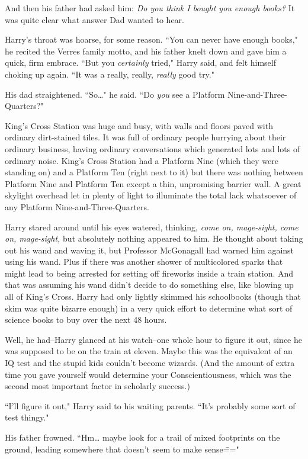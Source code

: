 And then his father had asked him: \emph{Do you think I bought you enough books?} It was quite clear what answer Dad wanted to hear.

Harry's throat was hoarse, for some reason. ``You can never have enough books," he recited the Verres family motto, and his father knelt down and gave him a quick, firm embrace. ``But you \emph{certainly} tried," Harry said, and felt himself choking up again. ``It was a really, really, \emph{really} good try."

His dad straightened. ``So{\ldots}" he said. ``Do \emph{you} see a Platform Nine-and-Three-Quarters?"

King's Cross Station was huge and busy, with walls and floors paved with ordinary dirt-stained tiles. It was full of ordinary people hurrying about their ordinary business, having ordinary conversations which generated lots and lots of ordinary noise. King's Cross Station had a Platform Nine (which they were standing on) and a Platform Ten (right next to it) but there was nothing between Platform Nine and Platform Ten except a thin, unpromising barrier wall. A great skylight overhead let in plenty of light to illuminate the total lack whatsoever of any Platform Nine-and-Three-Quarters.

Harry stared around until his eyes watered, thinking, \emph{come on, mage-sight, come on, mage-sight,} but absolutely nothing appeared to him. He thought about taking out his wand and waving it, but Professor McGonagall had warned him against using his wand. Plus if there was another shower of multicolored sparks that might lead to being arrested for setting off fireworks inside a train station. And that was assuming his wand didn't decide to do something else, like blowing up all of King's Cross. Harry had only lightly skimmed his schoolbooks (though that skim was quite bizarre enough) in a very quick effort to determine what sort of science books to buy over the next 48 hours.

Well, he had\---Harry glanced at his watch\---one whole hour to figure it out, since he was supposed to be on the train at eleven. Maybe this was the equivalent of an IQ test and the stupid kids couldn't become wizards. (And the amount of extra time you gave yourself would determine your Conscientiousness, which was the second most important factor in scholarly success.)

``I'll figure it out," Harry said to his waiting parents. ``It's probably some sort of test thingy."

His father frowned. ``Hm{\ldots} maybe look for a trail of mixed footprints on the ground, leading somewhere that doesn't seem to make sense\==="

